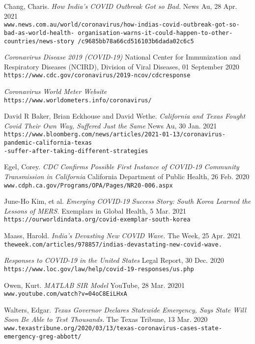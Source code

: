 \documentclass[a4paper,10pt]{article}
\begin{document}
\clearpage
\begin{thebibliography}{9}

Chang, Charis.
\textit{How India's COVID Outbreak Got so Bad.}
News Au, 28 Apr. 2021 
\\\texttt{www.news.com.au/world/coronavirus/how-indias-covid-outbreak-got-so-bad-as-world-health-
organisation-warns-it-could-happen-to-other-countries/news-story
/c9685bb78a66cd516103b6dada02c6c5}

\textit{Coronavirus Disease 2019 (COVID-19)} National Center for Immunization and Respiratory Diseases (NCIRD), Division of Viral Diseases, 01 September 2020
\\\texttt{https://www.cdc.gov/coronavirus/2019-ncov/cdcresponse}

\textit{Coronavirus World Meter Website}
\\\texttt{https://www.worldometers.info/coronavirus/}

David R Baker, Brian Eckhouse and David Wethe.
\textit{California and Texas Fought Covid Their Own Way, Suffered Just the Same}
News Au, 30 Jan. 2021    
\\\texttt{https://www.bloomberg.com/news/articles/2021-01-13/coronavirus-pandemic-california-texas\\-suffer-after-taking-different-strategies}

Egel, Corey.
\textit{CDC Confirms Possible First Instance of COVID-19 Community Transmission in California}
California Department of Public Health, 26 Feb. 2020    
\\\texttt{www.cdph.ca.gov/Programs/OPA/Pages/NR20-006.aspx}

 
June-Ho Kim, et al.
\textit{Emerging COVID-19 Success Story: South Korea Learned the Lessons of MERS.}
Exemplars in Global Health, 5 Mar. 2021
\\\texttt{https://ourworldindata.org/covid-exemplar-south-korea}

Maass, Harold.
\textit{India's Devasting New COVID Wave.}
The Week, 25 Apr. 2021 
\\\texttt{theweek.com/articles/978857/indias-devastating-new-covid-wave.}


\textit{Responses to COVID-19 in the United States}
Legal Report, 30 Dec. 2020    
\\\texttt{https://www.loc.gov/law/help/covid-19-responses/us.php}

Owen, Kurt. 
\textit{MATLAB SIR Model}
YouTube, 28 Mar. 20201    
\\\texttt{www.youtube.com/watch?v=04oC8EiLHxA}


Walters, Edgar.
\textit{Texas Governor Declares Statewide Emergency, Says State Will Soon Be Able to Test Thousands.}
The Texas Tribune, 13 Mar. 2020   
\\\texttt{www.texastribune.org/2020/03/13/texas-coronavirus-cases-state-emergency-greg-abbott/}








\end{thebibliography}
\end{document}
